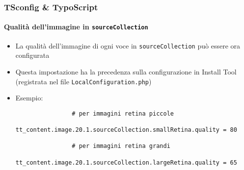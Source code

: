\begin{frame}[fragile]
	\frametitle{TSconfig \& TypoScript}
	\framesubtitle{Qualità dell'immagine in \texttt{sourceCollection}}

	\lstset{basicstyle=\tiny\ttfamily}

	\begin{itemize}

		\item La qualità dell'immagine di ogni voce in \texttt{sourceCollection} può essere ora configurata

		\item Questa impostazione ha la precedenza sulla configurazione in Install Tool\newline
			(registrata nel file \texttt{LocalConfiguration.php})

		\item Esempio:

			\begin{lstlisting}
				# per immagini retina piccole
				tt_content.image.20.1.sourceCollection.smallRetina.quality = 80

				# per immagini retina grandi
				tt_content.image.20.1.sourceCollection.largeRetina.quality = 65
			\end{lstlisting}

	\end{itemize}

\end{frame}


